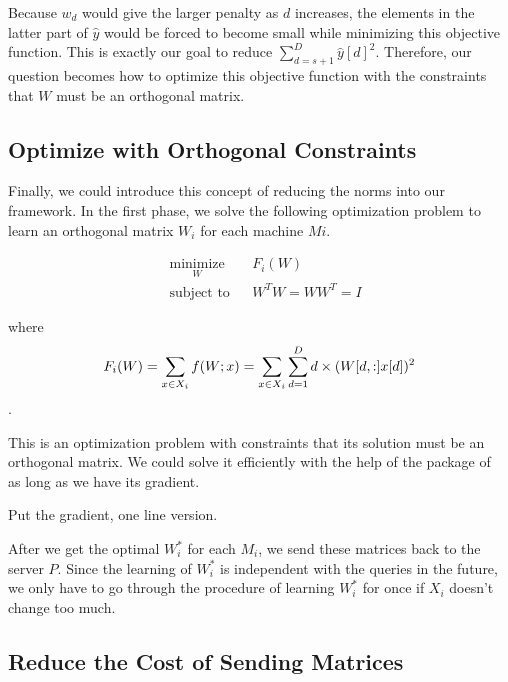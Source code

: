 Because $w_d$ would give the larger penalty as $d$ increases, the elements in the latter part of $\hat{y}$ would be forced to become small while minimizing this objective function.  This is exactly our goal to reduce $\sum^D_{d=s+1}{\hat{y}[d]^2}$.  Therefore, our question becomes how to optimize this objective function with the constraints that $W$ must be an orthogonal matrix.



\subsection{Optimize with Orthogonal Constraints} %
\label{ss:optimize_with_orthogonal_constraints}

Finally, we could introduce this concept of reducing the norms into our framework.  In the first phase, we solve the following optimization problem to learn an orthogonal matrix $W_i$ for each machine $Mi$.

\begin{equation}
\begin{aligned}
& \underset{W}{\text{minimize}}
& & F_i(W) \\
& \text{subject to}
& & W^{T}W=WW^{T}=I
\end{aligned}
\end{equation}

where 
\begin{equation}\label{objective-F}
	F_i(W)=\sum_{x \in X_i}{f(W;x)}\\
	=\sum_{x \in X_i}{ \sum^D_{d=1} {d\times(W[d,:]x[d])^2} }
\end{equation}.

This is an optimization problem with constraints that its solution must be an orthogonal matrix.  We could solve it efficiently with the help of the package of ~\cite{Fopt} as long as we have its gradient. 

Put the gradient, one line version.


After we get the optimal $W^*_i$ for each $M_i$, we send these matrices back to the server $P$.  Since the learning of $W^*_i$ is independent with the queries in the future, we only have to go through the procedure of learning $W^*_i$ for once if $X_i$ doesn't change too much.


\subsection{Reduce the Cost of Sending Matrices} %

